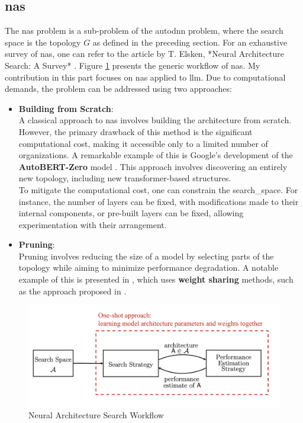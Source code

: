 \subsection{\acrfull{nas}}
\label{sec : nas}

The \acrshort{nas} problem is a sub-problem of the \acrshort{autodnn} problem, where the search space is the topology \( G \) as defined in the preceding section. For an exhaustive survey of \acrshort{nas}, one can refer to the article by T. Elsken, *Neural Architecture Search: A Survey* \cite{elsken_neural_2019}. Figure \ref{fig:nas} presents the generic workflow of \acrshort{nas}. My contribution in this part focuses on \acrshort{nas} applied to \acrshort{llm}. Due to computational demands, the problem can be addressed using two approaches:

\begin{itemize}
    

    \item \textbf{Building from Scratch}:\\
    A classical approach to \acrshort{nas} involves building the architecture from scratch. However, the primary drawback of this method is the significant computational cost, making it accessible only to a limited number of organizations. A remarkable example of this is Google's development of the \textbf{AutoBERT-Zero} model \cite{gao_autobert-zero_2022}. This approach involves discovering an entirely new topology, including new transformer-based structures.\\
    To mitigate the computational cost, one can constrain the \gls{search_space}. For instance, the number of layers can be fixed, with modifications made to their internal components, or pre-built layers can be fixed, allowing experimentation with their arrangement.

    \item \textbf{Pruning}:\\
    Pruning involves reducing the size of a model by selecting parts of the topology while aiming to minimize performance degradation. A notable example of this is presented in \cite{klein_structural_2023}, which uses \textbf{weight sharing} methods, such as the approach proposed in \cite{pham_efficient_2018}.
\end{itemize}

\begin{figure}
    \centering
    \includegraphics[width=0.6\linewidth]{assets/img/chap_2/NAS-high-level.png}
    \caption{Neural Architecture Search Workflow}
    \label{fig:nas}
\end{figure}

